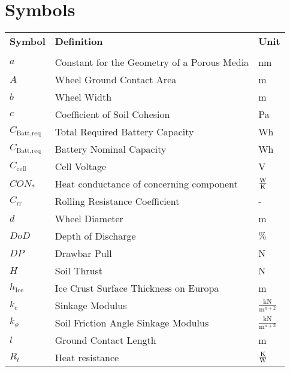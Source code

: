 \chapter*{Symbols}



\renewcommand{\arraystretch}{1.2}

\begin{longtable}[l]{lll}

	\textbf{Symbol}	&	\textbf{Definition}	\hspace{8cm}	&	\textbf{Unit}	\\ \\
	

\(a\)					&	Constant for the Geometry of a Porous Media	& nm							\\
\(A\)					&	Wheel Ground Contact Area					& m								\\
\(b\)					&	Wheel Width 								& m								\\
\(c\)					&	Coefficient of Soil Cohesion				& Pa							\\
$C_\text{Batt,req}$		&	Total Required Battery Capacity				& Wh							\\
$C_\text{Batt,req}$		&	Battery Nominal Capacity					& Wh							\\
$C_\text{cell}$			&	Cell Voltage								& V								\\
$CON_*$					&	Heat conductance of concerning component	& $\frac{{\rm W}}{{\rm K}}$				\\
\(C_\text{rr}\)		&	Rolling Resistance Coefficient					& -								\\	
\(d\)					&	Wheel Diameter								& m								\\
$DoD$					&	Depth of Discharge							& $\%$							\\
\(DP\)					&	Drawbar Pull								& N								\\
\(H\)					&	Soil Thrust									& N								\\
\(h_\text{Ice}\)		&	Ice Crust Surface Thickness on Europa		&	m							\\
\(k_\text{c}\)			&	Sinkage Modulus								& \(\frac{\text{kN}}{\text{m}^{n+2}}\) \\
\(k_\phi\)				&	Soil Friction Angle Sinkage Modulus			& \(\frac{\text{kN}}{\text{m}^{n+3}}\) \\
\(l\)					&	Ground Contact Length						& m								\\
$R_t$					&	Heat resistance								& $\frac{{\rm K}}{{\rm W}}$				\\

\end{longtable}
